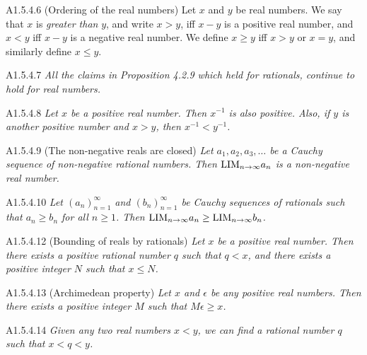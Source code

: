 \begin{definition}{A1.5.4.6}
    (Ordering of the real numbers) Let $x$ and $y$ be real numbers. We say that
    $x$ is \emph{greater than} $y$, and write $x > y$, iff $x - y$ is a positive
    real number, and $x < y$ iff $x - y$ is a negative real number. We define
    $x \geq y$ iff $x > y$ or $x = y$, and similarly define $x \leq y$.
\end{definition}

\begin{proposition}{A1.5.4.7}
    \emph{All the claims in Proposition 4.2.9 which held for rationals, continue
    to hold for real numbers.}
\end{proposition}

\begin{proposition}{A1.5.4.8}
    \emph{Let $x$ be a positive real number. Then $x^{-1}$ is also positive. Also,
    if $y$ is another positive number and $x > y$, then $x^{-1} < y^{-1}$.}
\end{proposition}

\begin{proposition}{A1.5.4.9}
    (The non-negative reals are closed) \emph{Let $a_1, a_2, a_3, \ldots$ be a
    Cauchy sequence of non-negative rational numbers. Then $\text{LIM}_{n \rightarrow \infty}{a_n}$ is
    a non-negative real number.}
\end{proposition}

\begin{corollary}{A1.5.4.10}
    \emph{Let $(a_n)_{n=1}^{\infty}$ and $(b_n)_{n=1}^{\infty}$ be Cauchy sequences
    of rationals such that $a_n \geq b_n$ for all $n \geq 1$. Then $\text{LIM}_{n \rightarrow \infty}{a_n}
    \geq \text{LIM}_{n \rightarrow \infty}{b_n}$.}
\end{corollary}

\begin{proposition}{A1.5.4.12}
    (Bounding of reals by rationals) \emph{Let $x$ be a positive real number. Then
    there exists a positive rational number $q$ such that $q < x$, and there exists
    a positive integer $N$ such that $x \leq N$.}
\end{proposition}

\begin{corollary}{A1.5.4.13}
    (Archimedean property) \emph{Let $x$ and $\epsilon$ be any positive
    real numbers. Then there exists a positive integer $M$ such that $M\epsilon \geq x$.}
\end{corollary}

\begin{proposition}{A1.5.4.14}
    \emph{Given any two real numbers $x < y$, we can find a rational number $q$
    such that $x < q < y$.}
\end{proposition}

